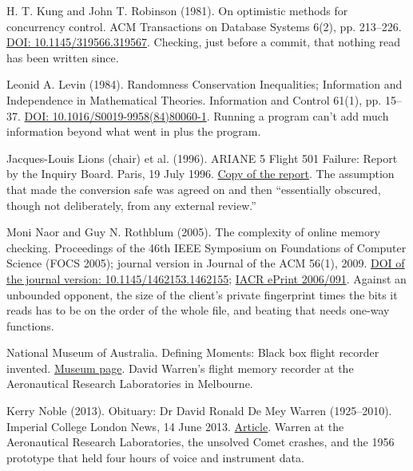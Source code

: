 \noindent H. T. Kung and John T. Robinson (1981). On optimistic methods for concurrency control. ACM Transactions on Database Systems 6(2), pp. 213--226. \href{https://doi.org/10.1145/319566.319567}{DOI: 10.1145/319566.319567}. Checking, just before a commit, that nothing read has been written since.
\par\medskip

\noindent Leonid A. Levin (1984). Randomness Conservation Inequalities; Information and Independence in Mathematical Theories. Information and Control 61(1), pp. 15--37. \href{https://doi.org/10.1016/S0019-9958(84)80060-1}{DOI: 10.1016/S0019-9958(84)80060-1}. Running a program can't add much information beyond what went in plus the program.
\par\medskip

\noindent Jacques-Louis Lions (chair) et al. (1996). ARIANE 5 Flight 501 Failure: Report by the Inquiry Board. Paris, 19 July 1996. \href{https://www-users.cse.umn.edu/~arnold/disasters/ariane5rep.html}{Copy of the report}. The assumption that made the conversion safe was agreed on and then ``essentially obscured, though not deliberately, from any external review.''
\par\medskip

\noindent Moni Naor and Guy N. Rothblum (2005). The complexity of online memory checking. Proceedings of the 46th IEEE Symposium on Foundations of Computer Science (FOCS 2005); journal version in Journal of the ACM 56(1), 2009. \href{https://doi.org/10.1145/1462153.1462155}{DOI of the journal version: 10.1145/1462153.1462155}; \href{https://eprint.iacr.org/2006/091}{IACR ePrint 2006/091}. Against an unbounded opponent, the size of the client's private fingerprint times the bits it reads has to be on the order of the whole file, and beating that needs one-way functions.
\par\medskip

\noindent National Museum of Australia. Defining Moments: Black box flight recorder invented. \href{https://www.nma.gov.au/defining-moments/resources/black-box-invented}{Museum page}. David Warren's flight memory recorder at the Aeronautical Research Laboratories in Melbourne.
\par\medskip

\noindent Kerry Noble (2013). Obituary: Dr David Ronald De Mey Warren (1925--2010). Imperial College London News, 14 June 2013. \href{https://www.imperial.ac.uk/news/122905/obituary-dr-david-ronald-de-mey/}{Article}. Warren at the Aeronautical Research Laboratories, the unsolved Comet crashes, and the 1956 prototype that held four hours of voice and instrument data.
\par\medskip

